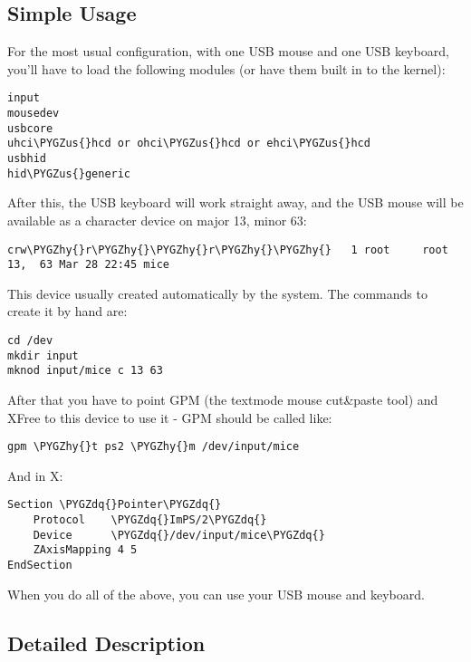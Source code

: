 \documentclass[a4paper,8pt,english]{sphinxmanual}
\def\PYGZus{\char`\_}
\def\PYGZhy{\char`\-}
\def\PYGZdq{\char`\"}
\begin{document}
\subsection{Simple Usage}
\label{input/input:simple-usage}
For the most usual configuration, with one USB mouse and one USB keyboard,
you'll have to load the following modules (or have them built in to the
kernel):

\begin{Verbatim}[commandchars=\\\{\}]
input
mousedev
usbcore
uhci\PYGZus{}hcd or ohci\PYGZus{}hcd or ehci\PYGZus{}hcd
usbhid
hid\PYGZus{}generic
\end{Verbatim}

After this, the USB keyboard will work straight away, and the USB mouse
will be available as a character device on major 13, minor 63:

\begin{Verbatim}[commandchars=\\\{\}]
crw\PYGZhy{}r\PYGZhy{}\PYGZhy{}r\PYGZhy{}\PYGZhy{}   1 root     root      13,  63 Mar 28 22:45 mice
\end{Verbatim}

This device usually created automatically by the system. The commands
to create it by hand are:

\begin{Verbatim}[commandchars=\\\{\}]
cd /dev
mkdir input
mknod input/mice c 13 63
\end{Verbatim}

After that you have to point GPM (the textmode mouse cut\&paste tool) and
XFree to this device to use it - GPM should be called like:

\begin{Verbatim}[commandchars=\\\{\}]
gpm \PYGZhy{}t ps2 \PYGZhy{}m /dev/input/mice
\end{Verbatim}

And in X:

\begin{Verbatim}[commandchars=\\\{\}]
Section \PYGZdq{}Pointer\PYGZdq{}
    Protocol    \PYGZdq{}ImPS/2\PYGZdq{}
    Device      \PYGZdq{}/dev/input/mice\PYGZdq{}
    ZAxisMapping 4 5
EndSection
\end{Verbatim}

When you do all of the above, you can use your USB mouse and keyboard.


\subsection{Detailed Description}
\label{input/input:detailed-description}
\end{document}
